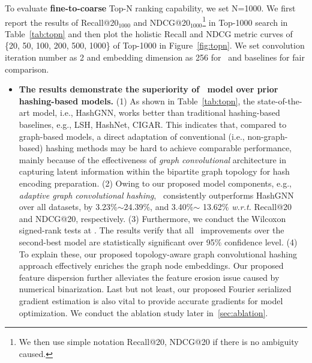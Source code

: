 To evaluate \textbf{fine-to-coarse} Top-N ranking capability, we set N=1000.
We first report the results of Recall@20$_{1000}$ and NDCG@20$_{1000}$\footnote{We then use simple notation Recall@20, NDCG@20 if there is no ambiguity caused.} in Top-1000 search in Table~\ref{tab:topn} and then plot the holistic Recall and NDCG metric curves of \{20, 50, 100, 200, 500, 1000\} of Top-1000 in Figure~\ref{fig:topn}.
We set convolution iteration number as 2 and embedding dimension as 256 for \model~and baselines for fair comparison.
\begin{itemize}[leftmargin=*]

\item \textbf{The results demonstrate the superiority of \model~model over prior hashing-based models.}
(1) As shown in Table~\ref{tab:topn}, the state-of-the-art model, i.e., HashGNN, works better than traditional hashing-based baselines, e.g., LSH, HashNet, CIGAR. 
This indicates that, compared to graph-based models, a direct adaptation of conventional (i.e., non-graph-based) hashing methods may be hard to achieve comparable performance, mainly because of the effectiveness of \textit{graph convolutional} architecture in capturing latent information within the bipartite graph topology for hash encoding preparation.
(2) Owing to our proposed model components, e.g., \textit{adaptive graph convolutional hashing}, \model~consistently outperforms HashGNN over all datasets, by 3.23\%$\sim$24.39\%, and 3.40\%$\sim$ 13.62\% \textit{w.r.t.} Recall@20 and NDCG@20, respectively.
(3) Furthermore, we conduct the Wilcoxon signed-rank tests at \model.
The results verify that all \model~improvements over the second-best model are statistically significant over 95\% confidence level.
(4) To explain these, our proposed topology-aware graph convolutional hashing 
approach effectively enriches the graph node embeddings.
Our proposed feature dispersion further alleviates the feature erosion issue caused by numerical binarization. 
Last but not least, our proposed Fourier serialized gradient estimation is also vital to provide accurate gradients for model optimization.
We conduct the ablation study later in~\cref{sec:ablation}.



\end{itemize}
